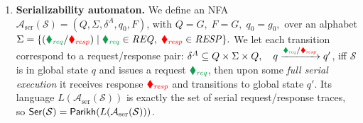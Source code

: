 \begin{enumerate}
	\item  \textbf{Serializability automaton.} 
	We define an NFA 
	\(
	\mathcal A_{\mathrm{ser}}(\mathcal S)=(Q,\Sigma,\delta^A,q_0,F)
	\), with
	\( Q=G,\;F=G,\;q_0=g_0,
	\)
	over an alphabet
	\(
	\Sigma=\{({\color{ForestGreen}\blacklozenge_{\mathit{req}}}/{\color{red}\blacklozenge_{\mathit{resp}}})
	\mid {\color{ForestGreen}\blacklozenge_{\mathit{req}}}\in\mathit{REQ},\;
	{\color{red}\blacklozenge_{\mathit{resp}}}\in\mathit{RESP}\}.
	\)
%	
%
We let each transition correspond to a request/response pair:
\(
\delta^A \subseteq Q \times \Sigma \times Q,
\quad q \xrightarrow{{\color{ForestGreen}\blacklozenge_{\mathit{req}}}/{\color{red}\blacklozenge_{\mathit{resp}}}} q'
\),
%
iff $\mathcal S$ is in global state $q$ and issues a request
$	{\color{ForestGreen}\blacklozenge_{\mathit{req}}}$, then upon some \textit{full serial execution} it receives response $	{\color{red}\blacklozenge_{\mathit{resp}}}$
	and transitions to global state  $q'$.
%
%
%
%
%
%
%
%	
	Its language $L(\mathcal A_{\mathrm{ser}}(\mathcal S))$ is exactly the set of serial request/response traces, so $\mathsf{Ser}(\mathcal S)=\mathsf{Parikh}(L(\mathcal A_{\mathrm{ser}}(\mathcal S)))$.
	

\end{enumerate}
